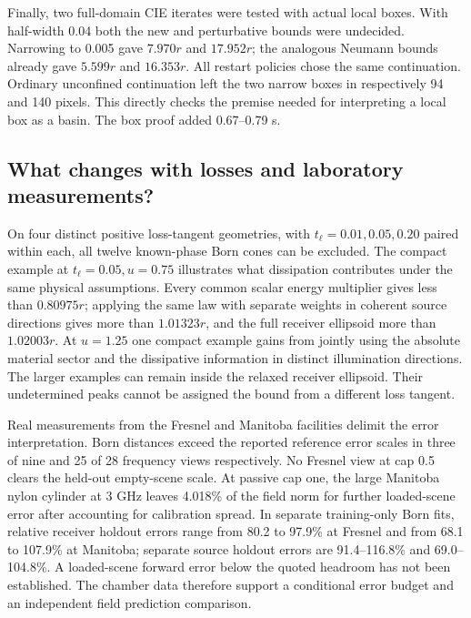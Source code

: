 Finally, two full-domain CIE iterates were tested with actual local boxes. With half-width 0.04 both the new and perturbative bounds were undecided. Narrowing to 0.005 gave $7.970r$ and $17.952r$; the analogous Neumann bounds already gave $5.599r$ and $16.353r$. All restart policies chose the same continuation. Ordinary unconfined continuation left the two narrow boxes in respectively 94 and 140 pixels. This directly checks the premise needed for interpreting a local box as a basin. The box proof added 0.67--0.79 s.

\subsection{What changes with losses and laboratory measurements?}
On four distinct positive loss-tangent geometries, with $t_\ell=0.01,0.05,0.20$ paired within each, all twelve known-phase Born cones can be excluded. The compact example at $t_\ell=0.05,u=0.75$ illustrates what dissipation contributes under the same physical assumptions. Every common scalar energy multiplier gives less than $0.80975r$; applying the same law with separate weights in coherent source directions gives more than $1.01323r$, and the full receiver ellipsoid more than $1.02003r$. At $u=1.25$ one compact example gains from jointly using the absolute material sector and the dissipative information in distinct illumination directions. The larger examples can remain inside the relaxed receiver ellipsoid. Their undetermined peaks cannot be assigned the bound from a different loss tangent.

Real measurements from the Fresnel and Manitoba facilities \cite{fresnel,manitoba} delimit the error interpretation. Born distances exceed the reported reference error scales in three of nine and 25 of 28 frequency views respectively. No Fresnel view at cap 0.5 clears the held-out empty-scene scale. At passive cap one, the large Manitoba nylon cylinder at 3 GHz leaves 4.018\% of the field norm for further loaded-scene error after accounting for calibration spread. In separate training-only Born fits, relative receiver holdout errors range from 80.2 to 97.9\% at Fresnel and from 68.1 to 107.9\% at Manitoba; separate source holdout errors are 91.4--116.8\% and 69.0--104.8\%. A loaded-scene forward error below the quoted headroom has not been established. The chamber data therefore support a conditional error budget and an independent field prediction comparison.
